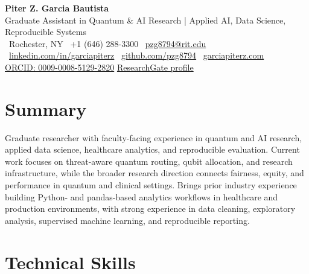 \documentclass[10pt]{article}
\begin{document}

\begin{center}
    {\Huge \textbf{Piter Z. Garcia Bautista}} \\
    \vspace{4pt}
    {\large Graduate Assistant in Quantum \& AI Research | Applied AI, Data Science, Reproducible Systems} \\
    \vspace{4pt}
    \faMapMarker* \, Rochester, NY \quad
    \faPhone \, +1 (646) 288-3300 \quad
    \faEnvelope \, \href{mailto:pzg8794@rit.edu}{pzg8794@rit.edu} \\
    \faLinkedin \, \href{https://linkedin.com/in/garciapiterz}{linkedin.com/in/garciapiterz} \quad
    \faGithub \, \href{https://github.com/pzg8794}{github.com/pzg8794} \quad
    \faGlobe \, \href{https://garciapiterz.com}{garciapiterz.com} \\
    \href{https://orcid.org/0009-0008-5129-2820}{ORCID: 0009-0008-5129-2820} \quad
    \href{https://www.researchgate.net/profile/Piter-Zacari-Garcia-Bautista}{ResearchGate profile}
\end{center}


\section{Summary}
\vspace{-4pt}
Graduate researcher with faculty-facing experience in quantum and AI research, applied data science, healthcare analytics, and reproducible evaluation. Current work focuses on threat-aware quantum routing, qubit allocation, and research infrastructure, while the broader research direction connects fairness, equity, and performance in quantum and clinical settings. Brings prior industry experience building Python- and pandas-based analytics workflows in healthcare and production environments, with strong experience in data cleaning, exploratory analysis, supervised machine learning, and reproducible reporting.


\section{Technical Skills}
\end{document}
